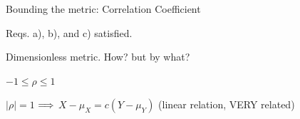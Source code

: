 \documentclass[handout,fleqn,aspectratio=169]{beamer}
\begin{document}
\begin{frame}{Bounding the metric: Correlation Coefficient}

\plitemsep 0.05in

\bci 

\item<1-> Reqs. a), b), and c) satisfied. 

\bce
\item<2->[d)] 
\ece

\item<3-> Dimensionless metric. How?  but by what?

\item<6-> $-1 \le \rho \le 1$

\item<7-> $|\rho|=1$ $\Longrightarrow$ $X-\mu_X = c(Y-\mu_Y)$ (linear relation, VERY related)

\eci

\end{frame}
\end{document}
